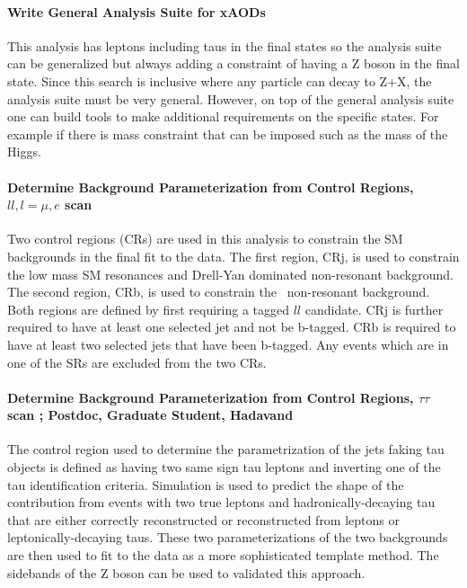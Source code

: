 \paragraph{Write General Analysis Suite for xAODs} %
This analysis has leptons including taus in the final states so the analysis suite can be generalized but always adding a constraint of having a Z boson in the final state. 
Since this search is inclusive where any particle can decay to Z+X, the analysis suite must be very general. 
However, on top of the general analysis suite one can build tools to make additional requirements on the specific states. For example if there is mass constraint that can be imposed such as the mass of the Higgs.

\paragraph{Determine Background Parameterization from Control Regions, $ll, l=\mu, e$ scan}
Two control regions (CRs) are used in this analysis to constrain the SM backgrounds in the final fit to the data. The first region, CRj, is used to constrain the 
low mass SM resonances and Drell-Yan dominated non-resonant background. The second region, CRb, is used to constrain the \ttbar\ non-resonant background.
Both regions are defined by first requiring a tagged $ll$ candidate. CRj is further required to have
at least one selected jet and not be b-tagged. CRb is required to have at least two selected jets that have been b-tagged.
Any events which are in one of the SRs are excluded from the two CRs.

\paragraph{Determine Background Parameterization from Control Regions, $\tau\tau$ scan ;  Postdoc, Graduate Student, Hadavand}
The control region used to determine the parametrization of the jets faking tau objects is defined as having two same sign tau leptons and inverting one of the tau identification criteria.
Simulation is used to predict the shape of the contribution from events with two true leptons and hadronically-decaying tau that are either correctly reconstructed or reconstructed
from leptons or leptonically-decaying taus.  These two parameterizations of the two backgrounds are then used to fit to the data as a more sophisticated template method.  The sidebands of the Z boson
can be used to validated this approach.

